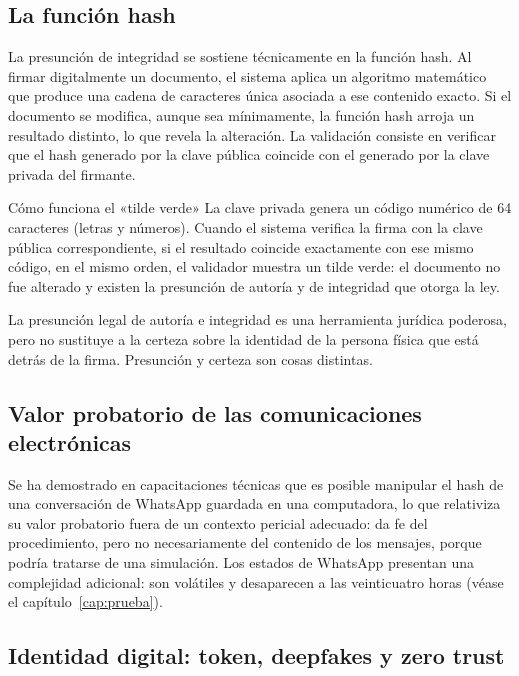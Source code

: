 \documentclass[12pt,oneside]{book}
\begin{document}
\subsection{La función hash}

La presunción de integridad se sostiene técnicamente en la función hash. Al firmar digitalmente un documento, el sistema aplica un algoritmo matemático que produce una cadena de caracteres única asociada a ese contenido exacto. Si el documento se modifica, aunque sea mínimamente, la función hash arroja un resultado distinto, lo que revela la alteración. La validación consiste en verificar que el hash generado por la clave pública coincide con el generado por la clave privada del firmante.

\begin{example}{Cómo funciona el «tilde verde»}
La clave privada genera un código numérico de 64 caracteres (letras y números). Cuando el sistema verifica la firma con la clave pública correspondiente, si el resultado coincide exactamente con ese mismo código, en el mismo orden, el validador muestra un tilde verde: el documento no fue alterado y existen la presunción de autoría y de integridad que otorga la ley.
\end{example}

\begin{important}
La presunción legal de autoría e integridad es una herramienta jurídica poderosa, pero no sustituye a la certeza sobre la identidad de la persona física que está detrás de la firma. Presunción y certeza son cosas distintas.
\end{important}

\subsection{Valor probatorio de las comunicaciones electrónicas}

Se ha demostrado en capacitaciones técnicas que es posible manipular el hash de una conversación de WhatsApp guardada en una computadora, lo que relativiza su valor probatorio fuera de un contexto pericial adecuado: da fe del procedimiento, pero no necesariamente del contenido de los mensajes, porque podría tratarse de una simulación. Los estados de WhatsApp presentan una complejidad adicional: son volátiles y desaparecen a las veinticuatro horas (véase el capítulo~\ref{cap:prueba}).

\subsection{Identidad digital: token, deepfakes y zero trust}
\end{document}
